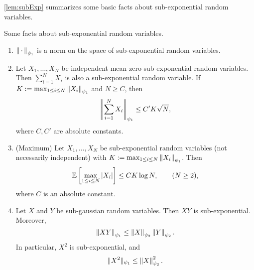 \noindent
\cref{lem:subExp} summarizes some basic facts about sub-exponential random variables.
\begin{lem}\label{lem:subExp}
    Some facts about sub-exponential random variables.
    \begin{enumerate}[label=(\alph*)]
        \item \label{lem:subExp-a} $\left\|{\, \cdot \,}\right\|_{\psi_1}$ is a norm on the space of sub-exponential random variables.
        \item \label{lem:subExp-b} Let $X_1, \ldots, X_N$ be independent mean-zero sub-exponential random variables. Then $\sum_{i=1}^N X_i$ is also a sub-exponential random variable. If $K := \max_{1 \le i \le N} \left\|{X_i}\right\|_{\psi_1}$ and $N \ge C$, then
        \[ 
            \left\|{\sum_{i=1}^N X_i}\right\|_{\psi_1} \le C' K \sqrt{N},   
        \]
        where $C, C'$ are absolute constants.
        \item \label{lem:subExp-c} (Maximum) Let $X_1, \ldots, X_N$ be sub-exponential random variables (not necessarily independent) with $K := \max_{1 \le i \le N} \left\|{X_i}\right\|_{\psi_1}$. Then
        \[ \mathbb{E}\left[ \max_{1 \le i \le N} \left|{X_i}\right| \right] \le  C K \log N,
        \qquad (N \ge 2), \]
        where $C$ is an absolute constant.
        \item \label{lem:subExp-d} Let $X$ and $Y$ be sub-gaussian random variables. Then $XY$ is sub-exponential. Moreover,
        \[ \left\|{XY}\right\|_{\psi_1} \le \left\|{X}\right\|_{\psi_2} \left\|{Y}\right\|_{\psi_2}. \]
        In particular, $X^2$ is sub-exponential, and
        \[ \| X^2 \|_{\psi_1} \le \left\|{X}\right\|_{\psi_2}^2. \] 
    \end{enumerate}
\end{lem}
